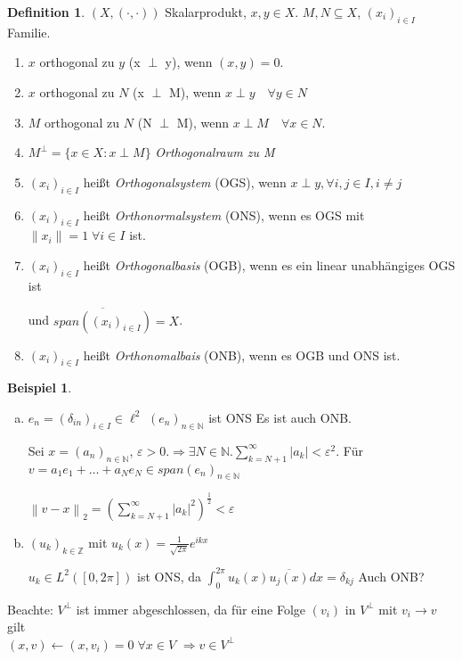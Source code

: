 \documentclass[ngerman]{report}
\theoremstyle{plain}%
\theoremstyle{definition}%
\newtheorem{definition}[thm]{Definition}
\newtheorem{bsp}[thm]{Beispiel}
\theoremstyle{myStyle}
\newcommand{\Z}{\mathbb{Z}}
\newcommand{\N}{\mathbb{N}}
\newcommand{\norm}[1]{\left \|#1\right\| }
\newcommand{\df}[1][]{%
	\overset{#1}{\Rightarrow}
}
\newcommand{\xf}{(x_i)_{i\in I}}
\newcommand{\ff}[3]{(#1_#2)_{#2\in#3}}
\newcommand{\SP}{\left (\cdot,\cdot \right)} %
\begin{document}
	\begin{definition}
		$(X,\SP)$ Skalarprodukt, $x,y\in X$. $M,N \subseteq X$, $(x_i)_{i\in I}$ Familie.
		\begin{enumerate}
			\item $x$ orthogonal zu $y$ (x $\perp$ y), wenn $(x,y) = 0$.
			\item $x$ orthogonal zu $N$ (x $\perp$ M), wenn $x \perp y\quad \forall y\in N$
			\item $M$ orthogonal zu $N$ (N $\perp$ M), wenn $x \perp M\quad \forall x\in N$.
			\item $M^\perp = \{x\in X: x\perp M\}$ \textit{Orthogonalraum zu M}
			\item $\xf$ heißt \textit{Orthogonalsystem} (OGS), wenn $x \perp y, \forall i,j \in I, i\neq j$
			\item $\xf$ heißt \textit{Orthonormalsystem} (ONS), wenn es OGS mit $\|x_i \| = 1 \; \forall i \in I$ ist. 
			\item $\xf$ heißt \textit{Orthogonalbasis} (OGB), wenn es ein linear unabhängiges OGS ist \par und $\overline{span(\xf)} = X$.
			\item $\xf$ heißt \textit{Orthonomalbais} (ONB), wenn es OGB und ONS ist.	
		\end{enumerate}
	\end{definition}
	\begin{bsp}
		\begin{enumerate}[a)]
			\item $e_n = (\delta_{in})_{i\in I} \in \ell^2$ $(e_n)_{n\in \N}$ ist ONS
			Es ist auch ONB.\par
			Sei $x = (a_n)_{n\in \N}$, $\varepsilon > 0. \df \exists N \in \N. \sum_{k=N+1}^\infty |a_k| < \varepsilon^2$.
			Für $v = a_1e_1 + \dots + a_Ne_N \in span(e_n)_{n\in\N}$ \par
			$\norm{v - x }_2 = \left( \sum_{k = N +1}^\infty |a_k|^2\right)^{\frac{1}{2}} < \varepsilon$

			\item $\ff{u}{k}{\Z}$ mit $u_k(x) = \frac{1}{\sqrt{2\pi}} e^{ikx}$ \par
			$u_k \in L^2([0,2\pi])$ ist ONS, da $\int_0^{2\pi} u_k(x) \overline{u_j(x)} dx = \delta_{kj}$ Auch ONB?
		\end{enumerate}
		Beachte: $V^\perp$ ist immer abgeschlossen, da für eine Folge $(v_i)$ in $V^\perp$ mit $v_i \to v$ gilt\\ $(x,v) \leftarrow (x,v_i) = 0 \; \forall x\in V$ $\df v \in V^\perp$
	\end{bsp}
\end{document}
